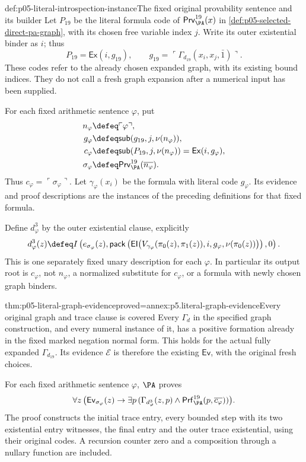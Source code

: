 \begin{hbdefinition}{def:p05-literal-introspection-instance}{The fixed original provability sentence and its builder}
Let \(P_{19}\) be the literal formula code of
\(\mathsf{Prv}^{19}_{\PA}(x)\) in
\cref{def:p05-selected-direct-pa-graph}, with its chosen free variable
index \(j\). Write its outer existential binder as \(i\); thus
\[
 P_{19}=\mathsf{Ex}(i,g_{19}),\qquad
 g_{19}=\ulcorner\Gamma_{d_{19}}(x_i,x_j,\bar1)\urcorner.
\]
These codes refer to the already chosen expanded graph, with its existing
bound indices. They do not call a fresh graph expansion after a numerical
input has been supplied.

For each fixed arithmetic sentence \(\varphi\), put
\[
\begin{aligned}
 n_\varphi&\defeq\ulcorner\varphi\urcorner,\\
 g_\varphi&\defeq\mathsf{sub}(g_{19},j,\nu(n_\varphi)),\\
 c_\varphi&\defeq\mathsf{sub}(P_{19},j,\nu(n_\varphi))
                         =\mathsf{Ex}(i,g_\varphi),\\
 \sigma_\varphi&\defeq
           \mathsf{Prv}^{19}_{\PA}(\overline{n_\varphi}).
\end{aligned}
\]
Thus \(c_\varphi=\ulcorner\sigma_\varphi\urcorner\). Let
\(\gamma_\varphi(x_i)\) be the formula with literal code
\(g_\varphi\). Its evidence and proof descriptions are the instances
of the preceding definitions for that fixed formula.

Define \(d^3_\varphi\) by the outer existential clause, explicitly
\[
 d^3_\varphi(z)\defeq
 I\left(e_{\sigma_\varphi}(z),
   \mathsf{pack}\left(
    \mathsf{EI}\bigl(
      V_{\gamma_\varphi}(\pi_0(z),\pi_1(z)),
                              i,g_\varphi,\nu(\pi_0(z))\bigr)\right),0\right).
\]
This is one separately fixed unary description for each
\(\varphi\). In particular its output root is \(c_\varphi\),
not \(n_\varphi\), a normalized substitute for \(c_\varphi\),
or a formula with newly chosen graph binders.
\end{hbdefinition}

\begin{hblemma}{thm:p05-literal-graph-evidence}{proved=annex:p5.literal-graph-evidence}{Every original graph and trace clause is covered}
Every \(\Gamma_d\) in the specified graph construction, and every
numeral instance of it, has a positive formation already in the fixed
marked negation normal form. This holds for the actual fully expanded
\(\Gamma_{d_{19}}\). Its evidence \(\mathcal E\) is therefore
the existing \(\mathsf{Ev}\), with the original fresh choices.

For each fixed arithmetic sentence \(\varphi\), \(\PA\) proves
\[
 \forall z\,\bigl(\mathsf{Ev}_{\sigma_\varphi}(z)\to
      \exists p\,(\Gamma_{d^3_\varphi}(z,p)\land
          \mathsf{Prf}^{19}_{\PA}(p,\overline{c_\varphi}))\bigr).
\]
The proof constructs the initial trace entry, every bounded step with its
two existential entry witnesses, the final entry and the outer trace
existential, using their original codes. A recursion counter zero and a
composition through a nullary function are included.
\end{hblemma}

